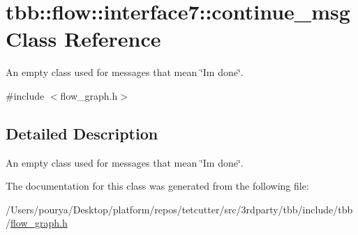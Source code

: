 \hypertarget{classtbb_1_1flow_1_1interface7_1_1continue__msg}{}\section{tbb\+:\+:flow\+:\+:interface7\+:\+:continue\+\_\+msg Class Reference}
\label{classtbb_1_1flow_1_1interface7_1_1continue__msg}


An empty class used for messages that mean \char`\"{}\+I\textquotesingle{}m done\char`\"{}.  




{\ttfamily \#include $<$flow\+\_\+graph.\+h$>$}



\subsection{Detailed Description}
An empty class used for messages that mean \char`\"{}\+I\textquotesingle{}m done\char`\"{}. 

The documentation for this class was generated from the following file\+:\begin{DoxyCompactItemize}
\item 
/\+Users/pourya/\+Desktop/platform/repos/tetcutter/src/3rdparty/tbb/include/tbb/\hyperlink{flow__graph_8h}{flow\+\_\+graph.\+h}\end{DoxyCompactItemize}
